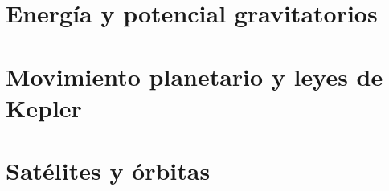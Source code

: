 ﻿\documentclass[11pt,letterpaper,openany]{book}
\newcommand{\rutaraiz}{../..}
\begin{document}

\chapter{Energía y potencial gravitatorios}





\chapter{Movimiento planetario y leyes de Kepler}





\chapter{Satélites y órbitas}





\backmatter
\end{document}
